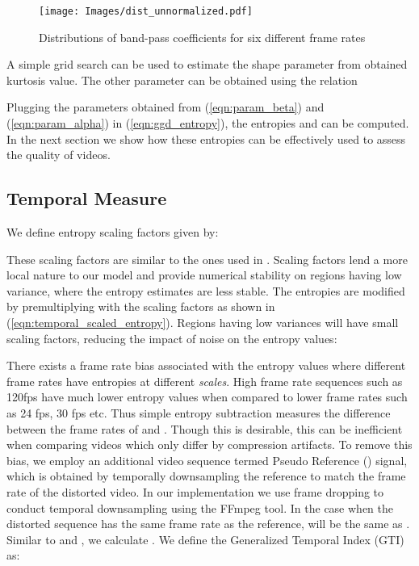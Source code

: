 \documentclass[journal]{IEEEtran}
\begin{document}
\begin{figure}[t]
    \centering
    \texttt{[image: Images/dist\_unnormalized.pdf]}
    \caption{Distributions of band-pass coefficients for six different frame rates}
    \label{fig:fps_comparison}
\end{figure}

A simple grid search can be used to estimate the shape parameter  from obtained kurtosis value. The other parameter  can be obtained using the relation 

Plugging the parameters obtained from (\ref{eqn:param_beta}) and (\ref{eqn:param_alpha}) in (\ref{eqn:ggd_entropy}), the entropies  and  can be computed. In the next section we show how these entropies can be effectively used to assess the quality of videos.
\vspace{-7pt}
\subsection{Temporal Measure}
We define entropy scaling factors given by:

These scaling factors are similar to the ones used in \cite{soundararajan2012rred,soundararajan2012video}. Scaling factors lend a more local nature to our model and provide numerical stability on regions having low variance, where the entropy estimates are less stable. The entropies are modified by premultiplying with the scaling factors as shown in (\ref{eqn:temporal_scaled_entropy}). Regions having low variances will have small scaling factors, reducing the impact of noise on the entropy values:

There exists a frame rate bias associated with the entropy values where different frame rates have entropies at different \textit{scales}. High frame rate sequences such as 120fps have much lower entropy values when compared to lower frame rates such as 24 fps, 30 fps etc. Thus simple entropy subtraction measures the difference between the frame rates of  and . Though this is desirable, this can be inefficient when comparing videos which only differ by compression artifacts. To remove this bias, we employ an additional video sequence termed Pseudo Reference () signal, which is obtained by temporally downsampling the reference to match the frame rate of the distorted video. In our implementation we use frame dropping to conduct temporal downsampling using the FFmpeg \cite{ffmpeg} tool. In the case when the distorted sequence has the same frame rate as the reference,  will be the same as . Similar to  and , we calculate . We define the Generalized Temporal Index (GTI) as:
\end{document}
